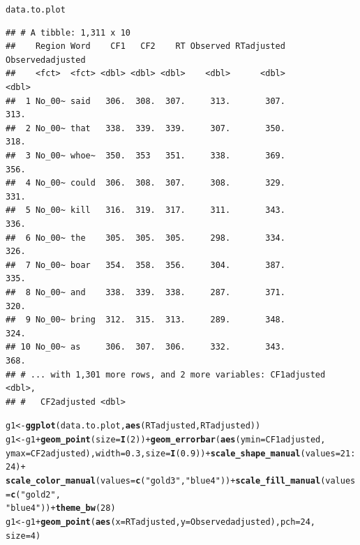 \documentclass{article}\usepackage[]{graphicx}\usepackage[]{color}
\makeatletter
\newcommand{\hlnum}[1]{\textcolor[rgb]{0.686,0.059,0.569}{#1}}%
\newcommand{\hlstr}[1]{\textcolor[rgb]{0.192,0.494,0.8}{#1}}%
\newcommand{\hlopt}[1]{\textcolor[rgb]{0,0,0}{#1}}%
\newcommand{\hlstd}[1]{\textcolor[rgb]{0.345,0.345,0.345}{#1}}%
\newcommand{\hlkwb}[1]{\textcolor[rgb]{0.69,0.353,0.396}{#1}}%
\newcommand{\hlkwc}[1]{\textcolor[rgb]{0.333,0.667,0.333}{#1}}%
\newcommand{\hlkwd}[1]{\textcolor[rgb]{0.737,0.353,0.396}{\textbf{#1}}}%
\newenvironment{kframe}{%
 \def\at@end@of@kframe{}%
 \ifinner\ifhmode%
  \def\at@end@of@kframe{\end{minipage}}%
  \begin{minipage}{\columnwidth}%
 \fi\fi%
 \def\FrameCommand##1{\hskip\@totalleftmargin \hskip-\fboxsep
 \colorbox{shadecolor}{##1}\hskip-\fboxsep
     \hskip-\linewidth \hskip-\@totalleftmargin \hskip\columnwidth}%
 \MakeFramed {\advance\hsize-\width
   \@totalleftmargin\z@ \linewidth\hsize
   \@setminipage}}%
 {\par\unskip\endMakeFramed%
 \at@end@of@kframe}
\newenvironment{knitrout}{}{} %
\makeatother
\begin{document}
\begin{knitrout}
\begin{kframe}
\begin{alltt}
\hlstd{data.to.plot}
\end{alltt}
\begin{verbatim}
## # A tibble: 1,311 x 10
##    Region Word    CF1   CF2    RT Observed RTadjusted Observedadjusted
##    <fct>  <fct> <dbl> <dbl> <dbl>    <dbl>      <dbl>            <dbl>
##  1 No_00~ said   306.  308.  307.     313.       307.             313.
##  2 No_00~ that   338.  339.  339.     307.       350.             318.
##  3 No_00~ whoe~  350.  353   351.     338.       369.             356.
##  4 No_00~ could  306.  308.  307.     308.       329.             331.
##  5 No_00~ kill   316.  319.  317.     311.       343.             336.
##  6 No_00~ the    305.  305.  305.     298.       334.             326.
##  7 No_00~ boar   354.  358.  356.     304.       387.             335.
##  8 No_00~ and    338.  339.  338.     287.       371.             320.
##  9 No_00~ bring  312.  315.  313.     289.       348.             324.
## 10 No_00~ as     306.  307.  306.     332.       343.             368.
## # ... with 1,301 more rows, and 2 more variables: CF1adjusted <dbl>,
## #   CF2adjusted <dbl>
\end{verbatim}
\begin{alltt}
\hlstd{g1} \hlkwb{<-} \hlkwd{ggplot}\hlstd{(data.to.plot,} \hlkwd{aes}\hlstd{(RTadjusted, RTadjusted))}
\hlstd{g1} \hlkwb{<-} \hlstd{g1} \hlopt{+} \hlkwd{geom_point}\hlstd{(}\hlkwc{size} \hlstd{=} \hlkwd{I}\hlstd{(}\hlnum{2}\hlstd{))} \hlopt{+} \hlkwd{geom_errorbar}\hlstd{(}\hlkwd{aes}\hlstd{(}\hlkwc{ymin} \hlstd{= CF1adjusted,}
    \hlkwc{ymax} \hlstd{= CF2adjusted),} \hlkwc{width} \hlstd{=} \hlnum{0.3}\hlstd{,} \hlkwc{size} \hlstd{=} \hlkwd{I}\hlstd{(}\hlnum{0.9}\hlstd{))} \hlopt{+} \hlkwd{scale_shape_manual}\hlstd{(}\hlkwc{values} \hlstd{=} \hlnum{21}\hlopt{:}\hlnum{24}\hlstd{)} \hlopt{+}
    \hlkwd{scale_color_manual}\hlstd{(}\hlkwc{values} \hlstd{=} \hlkwd{c}\hlstd{(}\hlstr{"gold3"}\hlstd{,} \hlstr{"blue4"}\hlstd{))} \hlopt{+} \hlkwd{scale_fill_manual}\hlstd{(}\hlkwc{values} \hlstd{=} \hlkwd{c}\hlstd{(}\hlstr{"gold2"}\hlstd{,}
    \hlstr{"blue4"}\hlstd{))} \hlopt{+} \hlkwd{theme_bw}\hlstd{(}\hlnum{28}\hlstd{)}
\hlstd{g1} \hlkwb{<-} \hlstd{g1} \hlopt{+} \hlkwd{geom_point}\hlstd{(}\hlkwd{aes}\hlstd{(}\hlkwc{x} \hlstd{= RTadjusted,} \hlkwc{y} \hlstd{= Observedadjusted),} \hlkwc{pch} \hlstd{=} \hlnum{24}\hlstd{,}
    \hlkwc{size} \hlstd{=} \hlnum{4}\hlstd{)}
\end{alltt}
\end{kframe}
\end{knitrout}
\end{document}
